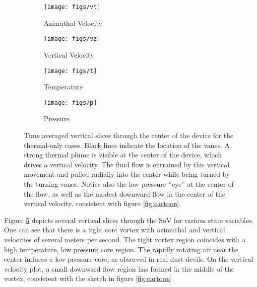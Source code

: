 \begin{figure}[htb]

 \begin{subfigure}{.5\textwidth}
  \centering
  \texttt{[image: figs/vt]}
  \caption{Azimuthal Velocity}
  \label{fig:vt-to}
 \end{subfigure}%
 \begin{subfigure}{.5\textwidth}
  \centering
  \texttt{[image: figs/vz]}
  \caption{Vertical Velocity}
  \label{fig:vz-to}
 \end{subfigure}%


 \begin{subfigure}{.5\textwidth}
  \centering
  \texttt{[image: figs/t]}
  \caption{Temperature}
  \label{fig:t-to}
 \end{subfigure}%
 \begin{subfigure}{.5\textwidth}
  \centering
  \texttt{[image: figs/p]}
  \caption{Pressure}
  \label{fig:p-to}
 \end{subfigure}%

 \caption{Time averaged vertical slices through the center of the device
 for the thermal-only cases. Black lines indicate the location of the
 vanes. A strong thermal plume is visible at the center of the device,
 which drives a vertical velocity. The fluid flow is entrained by this
 vertical movement and pulled radially into the center while being
 turned by the turning vanes. Notice also the low pressure ``eye'' at
 the center of the flow, as well as the modest downward flow in the
 center of the vertical velocity, consistent with figure \ref{fig:cartoon}.}
 \label{fig:to-vert}
\end{figure}

%
%
%
Figure \ref{fig:to-vert} depicts several vertical slices through the SoV
for various state variables. One can see that there is a tight core
vortex with azimuthal and vertical velocities of several meters per
second. The tight vortex region coincides with a high temperature, low
pressure core region. The rapidly rotating air near the center induces
a low pressure core, as observed in real dust devils.
On the vertical velocity plot, a small downward flow region has formed in
the middle of the vortex, consistent with the sketch in figure
\ref{fig:cartoon}.  

